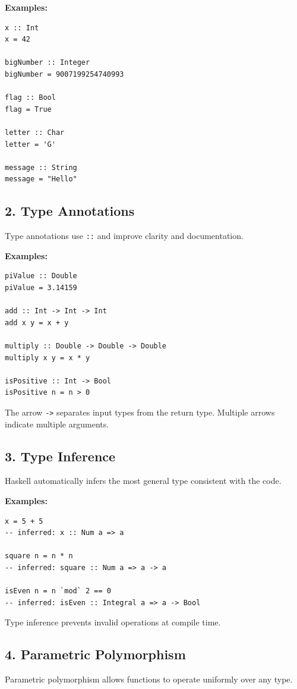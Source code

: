 \documentclass[12pt]{article}
\begin{document}
\textbf{Examples:}
\begin{verbatim}
x :: Int
x = 42

bigNumber :: Integer
bigNumber = 9007199254740993

flag :: Bool
flag = True

letter :: Char
letter = 'G'

message :: String
message = "Hello"
\end{verbatim}

\subsection{2. Type Annotations}

Type annotations use \texttt{::} and improve clarity and documentation.

\textbf{Examples:}
\begin{verbatim}
piValue :: Double
piValue = 3.14159

add :: Int -> Int -> Int
add x y = x + y

multiply :: Double -> Double -> Double
multiply x y = x * y

isPositive :: Int -> Bool
isPositive n = n > 0
\end{verbatim}

The arrow \texttt{->} separates input types from the return type. Multiple arrows indicate multiple arguments.

\subsection{3. Type Inference}

Haskell automatically infers the most general type consistent with the code.

\textbf{Examples:}
\begin{verbatim}
x = 5 + 5
-- inferred: x :: Num a => a

square n = n * n
-- inferred: square :: Num a => a -> a

isEven n = n `mod` 2 == 0
-- inferred: isEven :: Integral a => a -> Bool
\end{verbatim}

Type inference prevents invalid operations at compile time.

\subsection{4. Parametric Polymorphism}

Parametric polymorphism allows functions to operate uniformly over any type.
\end{document}
